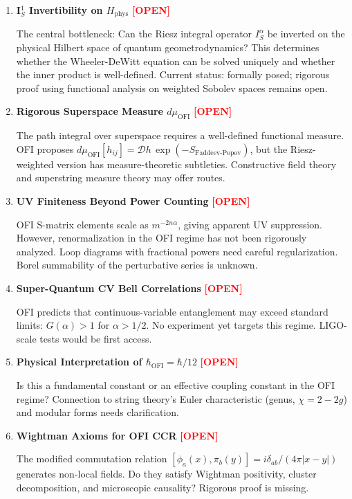 \documentclass[12pt,a4paper]{article}
\theoremstyle{definition}
\newcommand{\OPEN}[1]{\textbf{\textcolor{red}{[OPEN]}}}
\newcommand{\Ialpha}{I^{\alpha}}
\newcommand{\OFI}{\text{OFI}}
\newcommand{\hbarOFI}{\hbar_{\OFI}}
\begin{document}
\begin{enumerate}
\item \textbf{I$^1_S$ Invertibility on $H_{\text{phys}}$} \OPEN{CRITICAL}

   The central bottleneck: Can the Riesz integral operator $\Ialpha_S$ be inverted on the physical Hilbert space of quantum geometrodynamics? This determines whether the Wheeler-DeWitt equation can be solved uniquely and whether the inner product is well-defined. Current status: formally posed; rigorous proof using functional analysis on weighted Sobolev spaces remains open.

\item \textbf{Rigorous Superspace Measure $d\mu_{\OFI}$} \OPEN{CRITICAL}

   The path integral over superspace requires a well-defined functional measure. OFI proposes $d\mu_{\OFI}[h_{ij}] = \mathcal{D}h \, \exp(-S_{\text{Faddeev-Popov}})$, but the Riesz-weighted version has measure-theoretic subtleties. Constructive field theory and superstring measure theory may offer routes.

\item \textbf{UV Finiteness Beyond Power Counting} \OPEN{IMPORTANT}

   OFI S-matrix elements scale as $m^{-2n\alpha}$, giving apparent UV suppression. However, renormalization in the OFI regime has not been rigorously analyzed. Loop diagrams with fractional powers need careful regularization. Borel summability of the perturbative series is unknown.

\item \textbf{Super-Quantum CV Bell Correlations} \OPEN{IMPORTANT}

   OFI predicts that continuous-variable entanglement may exceed standard limits: $G(\alpha) > 1$ for $\alpha > 1/2$. No experiment yet targets this regime. LIGO-scale tests would be first access.

\item \textbf{Physical Interpretation of $\hbarOFI = \hbar/12$} \OPEN{IMPORTANT}

   Is this a fundamental constant or an effective coupling constant in the OFI regime? Connection to string theory's Euler characteristic (genus, $\chi = 2 - 2g$) and modular forms needs clarification.

\item \textbf{Wightman Axioms for OFI CCR} \OPEN{OPEN}

   The modified commutation relation $[\phi_a(x), \pi_b(y)] = i\delta_{ab}/(4\pi|x-y|)$ generates non-local fields. Do they satisfy Wightman positivity, cluster decomposition, and microscopic causality? Rigorous proof is missing.


\end{enumerate}
\end{document}
